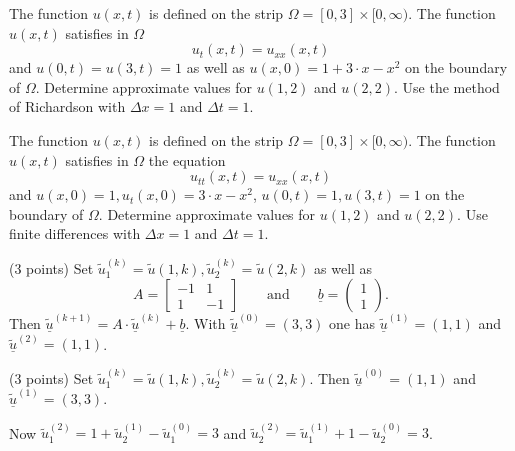 \begin{teilaufgaben}
\item
The function $u(x,t)$ is defined on the strip
$\Omega = [0, 3] \times [0,\infty)$.
The function $u(x,t)$ satisfies in $\Omega$
\[
u_{t}(x,t) = u_{xx}(x,t)
\]
and $u(0,t) = u(3,t) = 1$ as well as $u(x,0) = 1 + 3 \cdot x - x^2$ on the boundary of $\Omega$.
Determine approximate values for $u(1,2)$ and $u(2,2)$. 
Use the method of Richardson with $\Delta x = 1$ and $\Delta t = 1.$
\item
The function $u(x,t)$ is defined on the strip
$\Omega = [0, 3] \times [0,\infty)$.
The function $u(x,t)$ satisfies in $\Omega$ the equation
\[
u_{tt}(x,t) = u_{xx}(x,t)
\]
and  $u(x,0) = 1, u_t(x,0) = 3 \cdot x - x^2$, $u(0,t) = 1, u(3,t) = 1$
on the boundary of $\Omega$.
Determine approximate values for $u(1,2)$ and $u(2,2)$. 
Use finite differences with $\Delta x = 1$ and $\Delta t = 1$.
\end{teilaufgaben}

\begin{loesung}
\begin{teilaufgaben}
\item
(3 points) Set
$\tilde u_1^{(k)} = \tilde u(1,k), \tilde u_2^{(k)} = \tilde u(2,k)$
as well as
\[
A
=
\left[\begin{array}{rr} -1 & 1  \\ 1 & -1  \end{array}\right]
\qquad\text{and}\qquad
\underline{b}
=
\left(\begin{array}{r} 1 \\ 1 \end{array}\right).
\]
Then $\underline{\tilde u}^{(k+1)} = A \cdot \underline{\tilde u}^{(k)}
+ \underline{b}$.
With $\underline{\tilde u}^{(0)} = (3,3)$ one has
$\underline{\tilde u}^{(1)} = (1,1)$ and $\underline{\tilde u}^{(2)} = (1,1)$. 
\item
(3 points) Set $\tilde u_1^{(k)} =
\tilde u(1,k), \tilde u_2^{(k)} = \tilde u(2,k)$.
Then $\underline{\tilde u}^{(0)} = (1,1)$ and
$\underline{\tilde u}^{(1)} = (3,3)$.

Now $\tilde u_1^{(2)} = 1 + \tilde u_2^{(1)} - \tilde u_1^{(0)} = 3$ and
$\tilde u_2^{(2)} = \tilde u_1^{(1)} + 1 - \tilde u_2^{(0)} = 3$.
\qedhere
\end{teilaufgaben}
\end{loesung}

